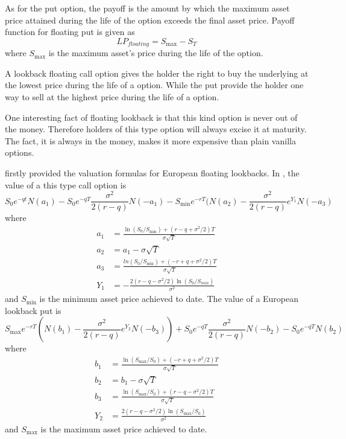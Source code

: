 \documentclass[12pt,oneside,titlepage]{book}
\begin{document}
As for the put option, the payoff is the amount by which the maximum asset price attained during the life of the option exceeds the final asset price. Payoff function for floating put is given as
\begin{equation}
LP_{floating}=S_{\max}-S_T
\end{equation}
where $S_{\max}$ is the maximum asset's price during the life of the option. 

A lookback floating call option gives the holder the right to buy the underlying at the lowest price during the life of a option. While the put provide the holder one way to sell at the highest price during the life of a option. 

One interesting fact of floating lookback is that this kind option is never out of the money. Therefore holders of this type option will always excise it at maturity. The fact, it is always in the money, makes it more expensive than plain vanilla options. 

\cite{Goldman1979} firstly provided the valuation formulas for European floating lookbacks. In \cite{Hull2008}, the value of a this type call option is
\begin{equation}\label{eq:3}
S_0e^{-qt}N(a_1) - S_0 e^{-qT}\frac{\sigma ^2}{2(r-q)} N(-a_1) - S_{\min} e^{-rT}(N(a_2) - \frac{\sigma^2}{2(r-q)} e ^{Y_1} N(-a_3)
\end{equation}
where
\begin{equation}\label{eq:4}
\begin{split}
a_1 &=\frac{\ln(S_0 / S_{\min}) + (r-q+\sigma^2 /2)T}{\sigma \sqrt{T}}\\
a_2 &= a_1 - \sigma \sqrt{T}\\
a_3 &= \frac{ln(S_0 / S_{\min})+ (-r+q+\sigma^2 / 2)T}{\sigma \sqrt{T}}\\
Y_1 &= - \frac{2(r-q-\sigma^2 / 2) \ln(S_0 / S_{min})}{\sigma^2}
\end{split}
\end{equation}
and $S_{\min}$ is the minimum asset price achieved to date.
The value of a European lookback put is
\begin{equation}\label{eq:5}
S_{\max} e^{-rT} ( N(b_1) - \frac{\sigma^2}{2(r-q)} e^{Y_2} N(-b_3)) + S_0 e^{-qT}\frac{\sigma^2}{2(r-q)} N(-b_2) - S_0 e^{-qT} N(b_2)
\end{equation}
where
\begin{equation}\label{eq:6}
\begin{split}
b_1 &= \frac{\ln(S_{\max} / S_0) + (-r + q + \sigma^2 /2)T}{\sigma \sqrt{T}}\\
b_2 &= b_1 - \sigma \sqrt{T}\\
b_3 &= \frac{\ln(S_{\max} / S_0) + (r-q-\sigma^2 /2)T}{\sigma \sqrt{T}}\\
Y_2 &= \frac{2(r-q-\sigma^2 / 2) \ln(S_{\max} / S_0)}{\sigma^2}
\end{split}
\end{equation}
and $S_{\max}$ is the maximum asset price achieved to date.
\end{document}
